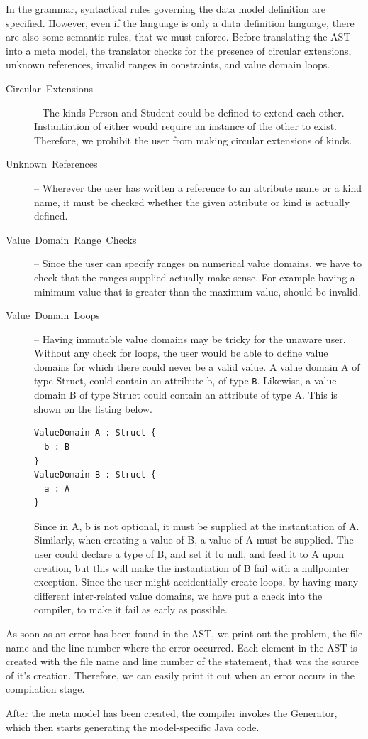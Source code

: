 In the grammar, syntactical rules governing the data model definition
are specified. However, even if the language is only a data definition
language, there are also some semantic rules, that we must enforce.
Before translating the AST into a meta model, the translator checks
for the presence of circular extensions, unknown references, invalid
ranges in constraints, and value domain loops.
\begin{description}
\item [{Circular~Extensions}] -- The kinds Person and Student could be
defined to extend each other. Instantiation of either would require
an instance of the other to exist. Therefore, we prohibit the user
from making circular extensions of kinds.
\item [{Unknown~References}] -- Wherever the user has written a reference
to an attribute name or a kind name, it must be checked whether the
given attribute or kind is actually defined.
\item [{Value~Domain~Range~Checks}] -- Since the user can specify ranges
on numerical value domains, we have to check that the ranges supplied
actually make sense. For example having a minimum value that is greater
than the maximum value, should be invalid.
\item [{Value~Domain~Loops}] -- Having immutable value domains may be
tricky for the unaware user. Without any check for loops, the user
would be able to define value domains for which there could never
be a valid value. A value domain A of type Struct, could contain an
attribute b, of type \texttt{B}. Likewise, a value domain B of type
Struct could contain an attribute of type A. This is shown on the
listing below.\\
\begin{lstlisting}
ValueDomain A : Struct {
  b : B
}
ValueDomain B : Struct {
  a : A
}
\end{lstlisting}Since in A, b is not optional, it must be supplied at the instantiation
of A. Similarly, when creating a value of B, a value of A must be
supplied. The user could declare a type of B, and set it to null,
and feed it to A upon creation, but this will make the instantiation
of B fail with a nullpointer exception. Since the user might accidentially
create loops, by having many different inter-related value domains,
we have put a check into the compiler, to make it fail as early as
possible.
\end{description}
As soon as an error has been found in the AST, we print out the problem,
the file name and the line number where the error occurred. Each element
in the AST is created with the file name and line number of the statement,
that was the source of it's creation. Therefore, we can easily print
it out when an error occurs in the compilation stage.

After the meta model has been created, the compiler invokes the Generator,
which then starts generating the model-specific Java code.
